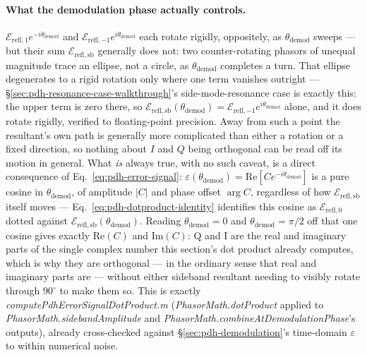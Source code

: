 \documentclass[9pt]{article}
\begin{document}
\paragraph{What the demodulation phase actually controls.}
$\mathcal{E}_{\mathrm{refl},1}e^{-i\theta_{\mathrm{demod}}}$ and
$\mathcal{E}_{\mathrm{refl},-1}e^{i\theta_{\mathrm{demod}}}$ each rotate
rigidly, oppositely, as $\theta_{\mathrm{demod}}$ sweeps --- but their sum
$\mathcal{E}_{\mathrm{refl,sb}}$ generally does not: two counter-rotating
phasors of unequal magnitude trace an ellipse, not a circle, as
$\theta_{\mathrm{demod}}$ completes a turn. That ellipse degenerates to a
rigid rotation only where one term vanishes outright ---
\S\ref{sec:pdh-resonance-case-walkthrough}'s side-mode-resonance case is
exactly this: the upper term is zero there, so
$\mathcal{E}_{\mathrm{refl,sb}}(\theta_{\mathrm{demod}}) = \mathcal{E}_{\mathrm{refl},-1}e^{i\theta_{\mathrm{demod}}}$
alone, and it does rotate rigidly, verified to floating-point precision.
Away from such a point the resultant's own path is generally more
complicated than either a rotation or a fixed direction, so nothing about
$I$ and $Q$ being orthogonal can be read off its motion in general.
What \emph{is} always true, with no such caveat, is a direct consequence of
Eq.~\eqref{eq:pdh-error-signal}: $\varepsilon(\theta_{\mathrm{demod}})=\mathrm{Re}[Ce^{-i\theta_{\mathrm{demod}}}]$
is a pure cosine in $\theta_{\mathrm{demod}}$, of amplitude $|C|$ and phase
offset $\arg C$, regardless of how $\mathcal{E}_{\mathrm{refl,sb}}$ itself
moves --- Eq.~\eqref{eq:pdh-dotproduct-identity} identifies this cosine as
$\mathcal{E}_{\mathrm{refl},0}$ dotted against
$\mathcal{E}_{\mathrm{refl,sb}}(\theta_{\mathrm{demod}})$. Reading
$\theta_{\mathrm{demod}}=0$ and $\theta_{\mathrm{demod}}=\pi/2$ off that one
cosine gives exactly $\mathrm{Re}(C)$ and $\mathrm{Im}(C)$: Q and I are the
real and imaginary parts of the single complex number this section's dot
product already computes, which is why they are orthogonal --- in the
ordinary sense that real and imaginary parts are --- without either
sideband resultant needing to visibly rotate through $90^\circ$ to make
them so. This is exactly \textit{computePdhErrorSignalDotProduct.m}
(\textit{PhasorMath.dotProduct} applied to
\textit{PhasorMath.sidebandAmplitude} and
\textit{PhasorMath.combineAtDemodulationPhase}'s outputs), already
cross-checked against \S\ref{sec:pdh-demodulation}'s time-domain
$\varepsilon$ to within numerical noise.
\end{document}
